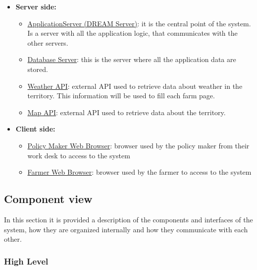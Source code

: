 \begin{itemize}
    \item \textbf{Server side:}
        \begin{itemize}
            \item \underline{ApplicationServer (DREAM Server)}: it is the central point of the system. Is a server with all the application logic, that communicates with the other servers. 
            \item \underline{Database Server}: this is the server where all the application data are stored.
            \item \underline{Weather API}: external API used to retrieve data about weather in the territory. This information will be used to fill each farm page.
            \item \underline{Map API}: external API used to retrieve data about the territory.
        \end{itemize}
    \item \textbf{Client side:}
        \begin{itemize}
            \item \underline{Policy Maker Web Browser}: browser used by the policy maker from their work desk to access to the system
            \item \underline{Farmer Web Browser}: browser used by the farmer to access to the system
        \end{itemize}
\end{itemize}


\subsection{Component view}

In this section it is provided a description of the components and interfaces of the system, how they are organized internally and how they communicate with each other.

\subsubsection{High Level}

